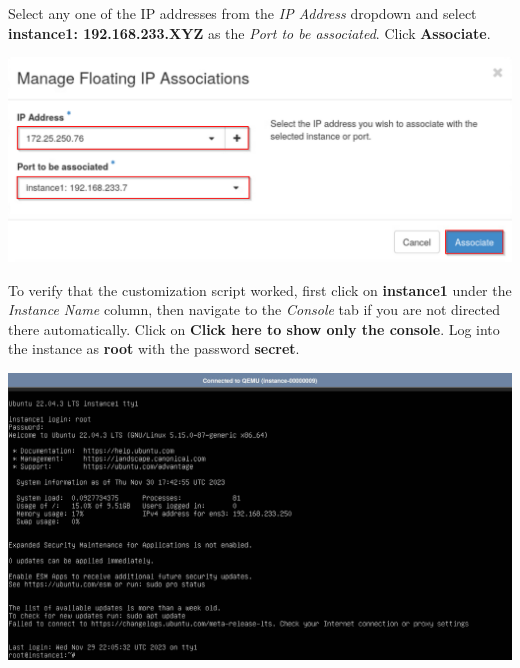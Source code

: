 \documentclass[letterpaper, 12pt]{article}
\begin{document}
\begin{enumerate}
    \begin{labstep}
        Select any one of the IP addresses from the \textit{IP Address} dropdown and select \textbf{instance1: 192.168.233.XYZ} as the \textit{Port to be associated}.
        Click \textbf{Associate}.

        \begin{center}
            \includegraphics[width=\linewidth]{images/part2/step12.png}
        \end{center}
    \end{labstep}

    \begin{labstep}

        To verify that the customization script worked, first click on \textbf{instance1} under the \textit{Instance Name} column, then navigate to the \textit{Console} tab if you are not directed there automatically.
        Click on \textbf{Click here to show only the console}.
        Log into the instance as \textbf{root} with the password \textbf{secret}.

        \begin{center}
            \includegraphics[width=\linewidth]{images/part2/step13.png}
        \end{center}
    \end{labstep}


\end{enumerate}
\end{document}
